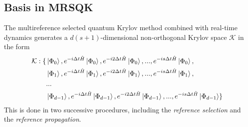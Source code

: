 \documentclass[journal=jctcce,manuscript=article]{achemso}
\newcommand{\methodname}[0]{multireference selected quantum Krylov\xspace}
\newcommand{\methodabbr}[0]{MRSQK\xspace}
\begin{document}
\subsection{Basis in \methodabbr}

The \methodname method combined with real-time dynamics generates a $d(s+1)$-dimensional non-orthogonal Krylov space $\mathcal{K}$ in the form 
\begin{equation}
\begin{split}
\label{krylov}
\mathcal{K} : \{ & \left\vert{\Phi_{0}}\right\rangle, e^{-i \Delta t \hat{H}} \left\vert{\Phi_{0}}\right\rangle, e^{-i 2 \Delta t \hat{H}} \left\vert{\Phi_{0}}\right\rangle, ... , e^{-i s\Delta t \hat{H}} \left\vert{\Phi_{0}}\right\rangle, \\
& \left\vert{\Phi_{1}}\right\rangle, e^{-i \Delta t \hat{H}} \left\vert{\Phi_{1}}\right\rangle, e^{-i 2 \Delta t \hat{H}} \left\vert{\Phi_{1}}\right\rangle, ... ,e^{-i s\Delta t \hat{H}} \left\vert{\Phi_{1}}\right\rangle, \\
& ... \\
& \left\vert{\Phi_{d-1}}\right\rangle, e^{-i \Delta t \hat{H}} \left\vert{\Phi_{d-1}}\right\rangle, e^{-i 2 \Delta t \hat{H}} \left\vert{\Phi_{d-1}}\right\rangle, ... ,e^{-i s\Delta t \hat{H}} \left\vert{\Phi_{d-1}}\right\rangle  \}  
\end{split}
\end{equation}
This is done in two successive procedures, including the \textit{reference selection} and the \textit{reference propagation}.
\end{document}
